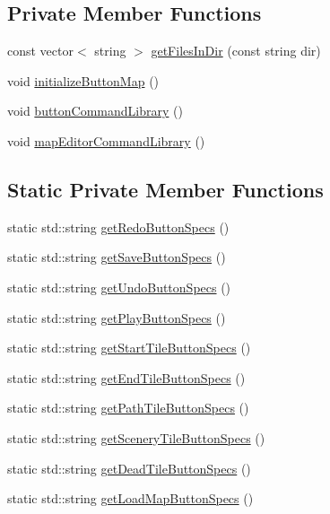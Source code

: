 \subsection*{Private Member Functions}
\begin{DoxyCompactItemize}
\item 
const vector$<$ string $>$ \hyperlink{class_game_state_map_editor_aa809c2e4d27cc2028f98790278459ae2}{get\+Files\+In\+Dir} (const string dir)
\item 
void \hyperlink{class_game_state_map_editor_ae144185a0fb6138d8381ea6a70c94dcd}{initialize\+Button\+Map} ()
\item 
void \hyperlink{class_game_state_map_editor_a3f2343fe7da91481f928ef9e9061458b}{button\+Command\+Library} ()
\item 
void \hyperlink{class_game_state_map_editor_aab39f5d619995539f39f9cd217130653}{map\+Editor\+Command\+Library} ()
\end{DoxyCompactItemize}
\subsection*{Static Private Member Functions}
\begin{DoxyCompactItemize}
\item 
static std\+::string \hyperlink{class_game_state_map_editor_ac71e0f13e89b6ecd7df2868293b1be25}{get\+Redo\+Button\+Specs} ()
\item 
static std\+::string \hyperlink{class_game_state_map_editor_a9151d492662a47b584dbda371f0e6935}{get\+Save\+Button\+Specs} ()
\item 
static std\+::string \hyperlink{class_game_state_map_editor_a1d140bbb202e9515530ab8c8b6022baa}{get\+Undo\+Button\+Specs} ()
\item 
static std\+::string \hyperlink{class_game_state_map_editor_a44da47e4ed2668bb4302467fb594d728}{get\+Play\+Button\+Specs} ()
\item 
static std\+::string \hyperlink{class_game_state_map_editor_a984f5c908281c5c40ec6e58cc6692475}{get\+Start\+Tile\+Button\+Specs} ()
\item 
static std\+::string \hyperlink{class_game_state_map_editor_a46d7fbc2e6360bb9a03990f03ca1c149}{get\+End\+Tile\+Button\+Specs} ()
\item 
static std\+::string \hyperlink{class_game_state_map_editor_a3e1da34ede3015ce2701082e93236d14}{get\+Path\+Tile\+Button\+Specs} ()
\item 
static std\+::string \hyperlink{class_game_state_map_editor_ab2f12c8e4f5b45131f2be03dd890f724}{get\+Scenery\+Tile\+Button\+Specs} ()
\item 
static std\+::string \hyperlink{class_game_state_map_editor_a04a6c24a81434220b91d1b70342d33bb}{get\+Dead\+Tile\+Button\+Specs} ()
\item 
static std\+::string \hyperlink{class_game_state_map_editor_ab7346157152360254a3886948d10eca8}{get\+Load\+Map\+Button\+Specs} ()
\end{DoxyCompactItemize}
